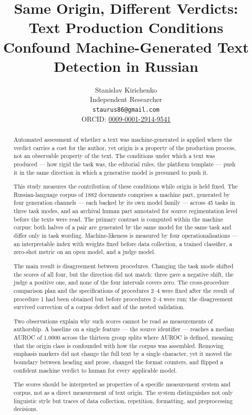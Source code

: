 \documentclass[11pt,a4paper]{article}
\title{Same Origin, Different Verdicts: Text Production Conditions Confound Machine-Generated Text Detection in Russian}
\author{Stanislav Kirichenko\\
\small Independent Researcher\\
\small \texttt{staurus86@gmail.com}\\
\small ORCID: \href{https://orcid.org/0009-0001-2914-9541}{0009-0001-2914-9541}}
\date{}
\renewcommand{\_}{\textunderscore\allowbreak}
\begin{document}
\maketitle
\begin{abstract}
Automated assessment of whether a text was machine-generated is applied where
the verdict carries a cost for the author, yet origin is a property of the
production process, not an observable property of the text. The conditions
under which a text was produced — how rigid the task was, the editorial rules,
the platform template — push it in the same direction in which a generative
model is presumed to push it.

This study measures the contribution of these conditions while origin is held
fixed. The Russian-language corpus of 1882 documents comprises a machine part,
generated by four generation channels — each backed by its own model family —
across 45 tasks in three task modes, and an
archival human part annotated for source regimentation level before the texts
were read. The primary contrast is computed within the machine corpus: both
halves of a pair are generated by the same model for the same task and differ
only in task wording. Machine-likeness is measured by four operationalisations
— an interpretable index with weights fixed before data collection, a trained
classifier, a zero-shot metric on an open model, and a judge model.

The main result is disagreement between procedures. Changing the task mode
shifted the scores of all four, but the direction did not match: three gave a
negative shift, the judge a positive one, and none of the four intervals
covers zero. The cross-procedure comparison plan and the specifications of
procedures 2–4 were fixed after the result of procedure 1 had been obtained
but before procedures 2–4 were run; the disagreement survived correction of a
corpus defect and of the nested validation.

Two observations explain why such scores cannot be read as measurements of
authorship. A baseline on a single feature — the source identifier — reaches a
median AUROC of 1.0000 across the thirteen group splits where AUROC is
defined, meaning that the origin
class is confounded with how the corpus was assembled. Removing emphasis
markers did not change the full text by a single character, yet it moved the
boundary between heading and prose, changed the format counters, and flipped a
confident machine verdict to human for every applicable model.

The scores should be interpreted as properties of a specific measurement
system and corpus, not as a direct measurement of text origin. The system
distinguishes not only linguistic style but traces of data collection,
repetition, formatting, and preprocessing decisions.
\end{abstract}
\end{document}
